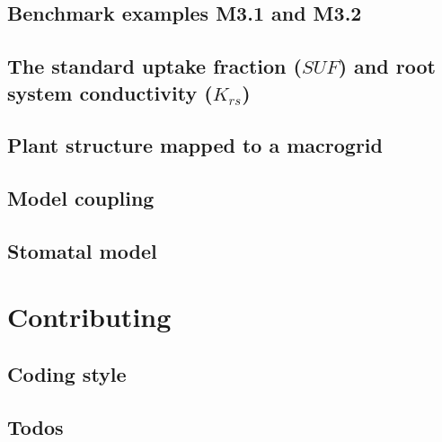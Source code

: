\documentclass[a4paper]{article}
\begin{document}
\subsection{Benchmark examples M3.1 and M3.2} \label{ssec:benchmarks3x}
% 

\subsection{The standard uptake fraction ($SUF$) and root system conductivity ($K_{rs}$)} \label{ssec:suf}
% 

\subsection{Plant structure mapped to a macrogrid} \label{ssec:mapped}
% 

\subsection{Model coupling} \label{ssec:coupling}
% 

\subsection{Stomatal model} \label{ssec:stomatal}
% 


\newpage
\section{Contributing} \label{sec:contributing}

\subsection{Coding style} \label{ssec:coding_style}


\subsection{Todos} \label{ssec:todos}





\newpage
 
 
\end{document}
